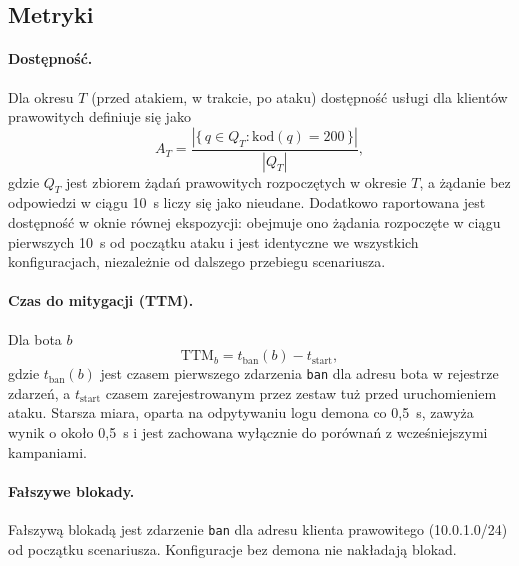 \documentclass[a4paper,12pt]{article}
\begin{document}
\subsection{Metryki}\label{sec:metryki}
\paragraph{Dostępność.} Dla okresu $T$ (przed atakiem, w trakcie, po ataku) dostępność usługi dla klientów prawowitych definiuje się jako
\begin{equation}
A_T = \frac{\left|\{\, q \in Q_T : \mathrm{kod}(q) = 200 \,\}\right|}{|Q_T|},
\end{equation}
gdzie $Q_T$ jest zbiorem żądań prawowitych rozpoczętych w okresie $T$, a żądanie bez odpowiedzi w ciągu 10~s liczy się jako nieudane. Dodatkowo raportowana jest dostępność w oknie równej ekspozycji: obejmuje ono żądania rozpoczęte w ciągu pierwszych 10~s od początku ataku i jest identyczne we wszystkich konfiguracjach, niezależnie od dalszego przebiegu scenariusza.

\paragraph{Czas do mitygacji (TTM).} Dla bota $b$
\begin{equation}
\mathrm{TTM}_b = t_{\mathrm{ban}}(b) - t_{\mathrm{start}},
\end{equation}
gdzie $t_{\mathrm{ban}}(b)$ jest czasem pierwszego zdarzenia \texttt{ban} dla adresu bota w rejestrze zdarzeń, a $t_{\mathrm{start}}$ czasem zarejestrowanym przez zestaw tuż przed uruchomieniem ataku. Starsza miara, oparta na odpytywaniu logu demona co 0,5~s, zawyża wynik o około 0,5~s i jest zachowana wyłącznie do porównań z wcześniejszymi kampaniami.

\paragraph{Fałszywe blokady.} Fałszywą blokadą jest zdarzenie \texttt{ban} dla adresu klienta prawowitego (10.0.1.0/24) od początku scenariusza. Konfiguracje bez demona nie nakładają blokad.
\end{document}
